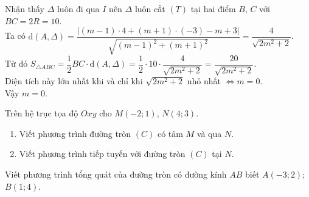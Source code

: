 \begin{bt}
{\begin{enumerate}
Nhận thấy $\Delta$ luôn đi qua $I$ nên $\Delta$ luôn cắt $(T)$ tại hai điểm $B$, $C$ với $BC=2R=10$.\\
Ta có $\mathrm{d}(A,\Delta) = \dfrac{|(m-1)\cdot 4 +(m+1)\cdot (-3) -m+3|}{\sqrt{(m-1)^2+(m+1)^2}} = \dfrac{4}{\sqrt{2m^2+2}}$.\\
Từ đó $S_{\triangle ABC} = \dfrac{1}{2} BC\cdot \mathrm{d}(A,\Delta) = \dfrac{1}{2} \cdot 10 \cdot \dfrac{4}{\sqrt{2m^2+2}} = \dfrac{20}{\sqrt{2m^2+2}}$.\\
Diện tích này lớn nhất khi và chỉ khi $\sqrt{2m^2+2}$ nhỏ nhất $\Leftrightarrow m=0$.\\
Vậy $m=0$.
\end{enumerate}
}
\end{bt}

\begin{bt}%
	Trên hệ trục tọa độ $Oxy$ cho $M(-2;1)$, $N(4;3)$.
	\begin{enumerate}
		\item Viết phương trình đường tròn $(C)$ có tâm $M$ và qua $N$.
		\item Viết phương trình tiếp tuyến với đường tròn $(C)$ tại $N$.
	\end{enumerate}
\end{bt}

\begin{bt}%
Viết phương trình tổng quát của đường tròn có đường kính $A B$ biết $A(-3 ; 2)$; $B(1 ; 4)$.
	
\end{bt}

